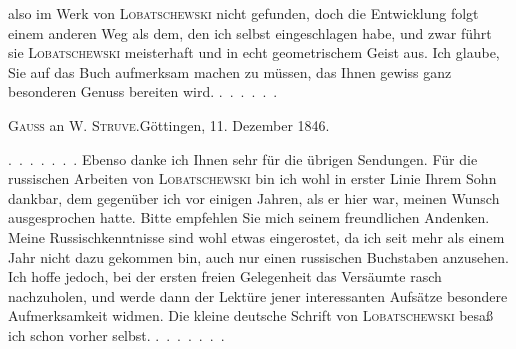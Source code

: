 %
also im Werk von \textsc{Lobatschewski} nicht gefunden, doch die Entwicklung
folgt einem anderen Weg als dem, den ich selbst eingeschlagen habe, und zwar führt sie
\textsc{Lobatschewski} meisterhaft und in echt geometrischem Geist aus.
Ich glaube, Sie auf das Buch aufmerksam machen zu müssen, das Ihnen gewiss
ganz besonderen Genuss bereiten wird. \mbox{.\ .\ .\ .\ .\ .}

\par\bigskip{}

\begin{center}
\textsc{Gauss} an W. \textsc{Struve}.\quad Göttingen, 11. Dezember 1846.
\end{center}

\mbox{.\ .\ .\ .\ .\ .\ .} Ebenso danke ich Ihnen sehr für die übrigen Sendungen.
Für die russischen Arbeiten von
\textsc{Lobatschewski} bin ich wohl in erster Linie Ihrem Sohn dankbar, dem gegenüber
ich vor einigen Jahren, als er hier war, meinen Wunsch ausgesprochen hatte.
Bitte empfehlen Sie mich seinem freundlichen Andenken. Meine
Russischkenntnisse sind wohl etwas eingerostet,
da ich seit mehr als einem Jahr nicht dazu gekommen bin, auch nur
einen russischen Buchstaben anzusehen. Ich hoffe jedoch, bei der ersten freien
Gelegenheit das Versäumte rasch nachzuholen, und werde dann der Lektüre jener
interessanten Aufsätze besondere Aufmerksamkeit widmen. Die kleine
deutsche Schrift von \textsc{Lobatschewski} besaß ich schon vorher
selbst. \mbox{.\ .\ .\ .\ .\ .\ .}


